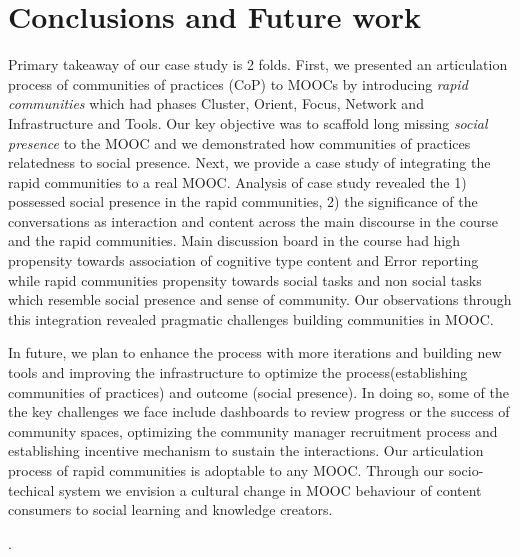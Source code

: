 \documentclass[manuscript,screen,review]{acmart}
\begin{document}
\section{Conclusions and Future work}
Primary takeaway of our case study is 2 folds. First, we presented an articulation process of communities of practices (CoP) to MOOCs by introducing \textit{rapid communities} which had phases Cluster, Orient, Focus, Network and Infrastructure and Tools. Our key objective was to scaffold long missing \textit{social presence} to the MOOC and we demonstrated how communities of practices relatedness to social presence. Next, we provide a case study of integrating the rapid communities to a real MOOC. Analysis of case study revealed the 1) possessed social presence in the rapid communities, 2) the significance of the conversations as interaction and content across the main discourse in the course and the rapid communities. Main discussion board in the course had high propensity towards association of cognitive type content and Error reporting while rapid communities propensity towards social tasks and non social tasks which resemble social presence and sense of community. Our observations through this integration revealed pragmatic challenges building communities in MOOC. 

In future, we plan to enhance the process with more iterations and building new tools and improving the infrastructure to optimize the process(establishing communities of practices) and outcome (social presence). In doing so, some of the the key challenges we face include dashboards to review progress or the success of community spaces, optimizing the community manager recruitment process and establishing incentive mechanism to sustain the interactions. Our articulation process of rapid communities is adoptable to any MOOC. Through our socio-techical system we envision a cultural change in MOOC behaviour of content consumers to social learning and knowledge creators. 

.  










\end{document}
